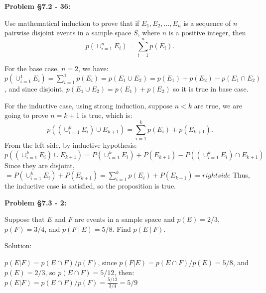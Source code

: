 \documentclass{article}
\newenvironment{problem}[1]
{\begin{mdframed}[default]
\textbf{Problem #1:}
}
{\end{mdframed}
}
\begin{document}
\begin{problem}{\S 7.2 - 36}
Use mathematical induction to prove that if $E_1, E_2, \dots, E_n$ is a sequence of
$n$ pairwise disjoint events in a sample space $S$, where $n$ is a positive
integer, then
\[ p\left( \cup_{i=1}^n E_i \right) = \sum_{i=1}^n p(E_i).\]

For the base case, $n=2$, we have: $p(\cup_{i=1}^1 E_i)=\sum_{i=1}^1 p(E_i)=p(E_1\cup E_2)=p(E_1)+p(E_2)-p(E_1\cap E_2)$, and since disjoint, $p(E_1\cup E_2)=p(E_1)+p(E_2)$ so it is true in base case.

For the inductive case, using strong induction, suppose $n<k$ are true, we are going to prove $n=k+1$ is true, which is: 
\[ p\left( (\cup_{i=1}^k E_i)\cup E_{k+1} \right) = \sum_{i=1}^{k} p(E_i)+p(E_{k+1}).\]
From the left side, by inductive hypothesis: \[p\left( (\cup_{i=1}^k E_i)\cup E_{k+1} \right)=P(\cup_{i=1}^k E_i)+P(E_{k+1})-P((\cup_{i=1}^k E_i)\cap E_{k+1})\]
Since they are disjoint, $=P(\cup_{i=1}^k E_i)+P(E_{k+1})=\sum_{i=1}^{k} p(E_i)+P(E_{k+1})=rightside$
Thus, the inductive case is satisfied, so the proposition is true.

\end{problem}
\begin{problem}{\S 7.3 - 2}
Suppose that $E$ and $F$ are events in a sample space and $p(E) = 2/3$, $p(F) =
3/4$, and $p(F~|~E) = 5/8$. Find $p(E~|~F)$.

Solution:

$p(E|F)=p(E\cap F)/p(F)$, since $p(F|E)=p(E\cap F)/p(E)=5/8$, and $p(E)=2/3$, so $p(E\cap F)=5/12$, then:
$p(E|F)=p(E\cap F)/p(F)=\frac{5/12}{3/4}=5/9$
\end{problem}
\end{document}
